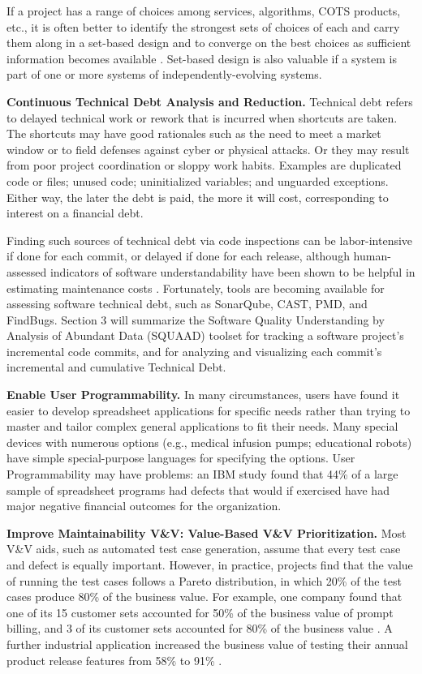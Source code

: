 If a project has a range of choices among services, algorithms, COTS products, etc., it is often better to identify the strongest sets of choices of each and carry them along in a set-based design and to converge on the best choices as sufficient information becomes available 
\cite{bernstein1998design,reinertsten2009principles}.  Set-based design is also valuable if a system is part of one or more systems of independently-evolving systems.

\textbf{Continuous Technical Debt Analysis and Reduction.}  Technical debt refers to delayed technical work or rework that is incurred when shortcuts are taken.  The shortcuts may have good rationales such as the need to meet a market window or to field defenses against cyber or physical attacks.  Or they may result from poor project coordination or sloppy work habits.  Examples are duplicated code or files; unused code; uninitialized variables; and unguarded exceptions.  Either way, the later the debt is paid, the more it will cost, corresponding to interest on a financial debt.

Finding such sources of technical debt via code inspections can be labor-intensive if done for each commit, or delayed if done for each release, although human-assessed indicators of software understandability have been shown to be helpful in estimating maintenance costs \cite{chen2016evaluating}.  Fortunately, tools are becoming available for assessing software technical debt, such as SonarQube, CAST, PMD, and FindBugs.  Section 3 will summarize the Software Quality Understanding by Analysis of Abundant Data (SQUAAD) toolset for tracking a software project's incremental code commits, and for analyzing and visualizing each commit's incremental and cumulative Technical Debt.

\textbf{Enable User Programmability.} In many circumstances, users have found it easier to develop spreadsheet applications for specific needs rather than trying to master and tailor complex general applications to fit their needs.   Many special devices with numerous options (e.g., medical infusion pumps; educational robots) have simple special-purpose languages for specifying the options.  User Programmability may have problems: an IBM study found that 44\% of a large sample of spreadsheet programs had defects that would if exercised have had major negative financial outcomes for the organization.

\textbf{Improve Maintainability V\&V: Value-Based V\&V Prioritization.}  Most V\&V aids, such as automated test case generation, assume that every test case and defect is equally important.  However, in practice, projects find that the value of running the test cases follows a Pareto distribution, in which 20\% of the test cases produce 80\% of the business value.  For example, one company found that one of its 15 customer sets accounted for 50\% of the business value of prompt billing, and 3 of its customer sets accounted for 80\% of the business value \cite{bullock2000calculating}.   A further industrial application increased the business value of testing their annual product release features from 58\% to 91\% \cite{li2012value}.

